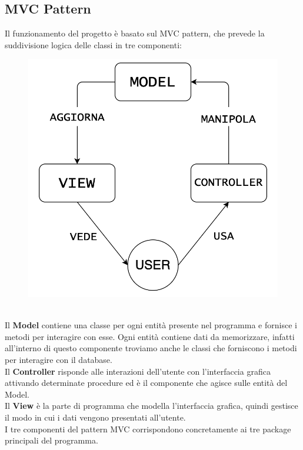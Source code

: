 \documentclass[12pt,a4paper]{article}
\begin{document}
	\subsection{MVC Pattern}
	Il funzionamento del progetto è basato sul MVC pattern, che prevede la suddivisione logica delle classi in tre componenti:
	\begin{figure}[h!]
		\centering
		\includegraphics[scale=0.4]{images/MVCPattern.png}
	\end{figure}\\
	Il \textbf{Model} contiene una classe per ogni entità presente nel programma e fornisce i metodi per interagire con esse. Ogni entità contiene dati da memorizzare, infatti all'interno di questo componente troviamo anche le classi che forniscono i metodi per interagire con il database.\\
	Il \textbf{Controller} risponde alle interazioni dell'utente con l'interfaccia grafica attivando determinate procedure ed è il componente che agisce sulle entità del Model.\\
	Il \textbf{View} è la parte di programma che modella l'interfaccia grafica, quindi gestisce il modo in cui i dati vengono presentati all'utente.\\
	I tre componenti del pattern MVC corrispondono concretamente ai tre package principali del programma.
\end{document}
